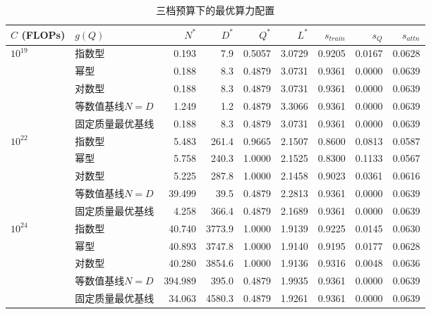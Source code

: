 \begin{table}[!htbp]
  \centering
  \caption{三档预算下的最优算力配置}
  \label{tab:q3_allocation}
  \songti{}
  \setlength{\tabcolsep}{4pt}
  \begin{tabular}{@{}l>{\raggedright\arraybackslash}p{2.4cm}rrrrrrr@{}}
    \toprule
    $C$ (FLOPs) & $g(Q)$ & $N^*$ & $D^*$ & $Q^*$ & $L^*$ & $s_{train}$ & $s_Q$ & $s_{attn}$ \\
    \midrule
    $10^{19}$ & 指数型 & 0.193 & 7.9 & 0.5057 & 3.0729 & 0.9205 & 0.0167 & 0.0628 \\
     & 幂型 & 0.188 & 8.3 & 0.4879 & 3.0731 & 0.9361 & 0.0000 & 0.0639 \\
     & 对数型 & 0.188 & 8.3 & 0.4879 & 3.0731 & 0.9361 & 0.0000 & 0.0639 \\
    & 等数值基线\newline $N=D$ & 1.249 & 1.2 & 0.4879 & 3.3066 & 0.9361 & 0.0000 & 0.0639 \\
    & 固定质量\newline 最优基线 & 0.188 & 8.3 & 0.4879 & 3.0731 & 0.9361 & 0.0000 & 0.0639 \\
    \midrule
    $10^{22}$ & 指数型 & 5.483 & 261.4 & 0.9665 & 2.1507 & 0.8600 & 0.0813 & 0.0587 \\
     & 幂型 & 5.758 & 240.3 & 1.0000 & 2.1525 & 0.8300 & 0.1133 & 0.0567 \\
     & 对数型 & 5.225 & 287.8 & 1.0000 & 2.1458 & 0.9023 & 0.0361 & 0.0616 \\
    & 等数值基线\newline $N=D$ & 39.499 & 39.5 & 0.4879 & 2.2813 & 0.9361 & 0.0000 & 0.0639 \\
    & 固定质量\newline 最优基线 & 4.258 & 366.4 & 0.4879 & 2.1689 & 0.9361 & 0.0000 & 0.0639 \\
    \midrule
    $10^{24}$ & 指数型 & 40.740 & 3773.9 & 1.0000 & 1.9139 & 0.9225 & 0.0145 & 0.0630 \\
     & 幂型 & 40.893 & 3747.8 & 1.0000 & 1.9140 & 0.9195 & 0.0177 & 0.0628 \\
     & 对数型 & 40.280 & 3854.6 & 1.0000 & 1.9136 & 0.9316 & 0.0048 & 0.0636 \\
    & 等数值基线\newline $N=D$ & 394.989 & 395.0 & 0.4879 & 1.9935 & 0.9361 & 0.0000 & 0.0639 \\
    & 固定质量\newline 最优基线 & 34.063 & 4580.3 & 0.4879 & 1.9261 & 0.9361 & 0.0000 & 0.0639 \\
    \bottomrule
  \end{tabular}
\end{table}
